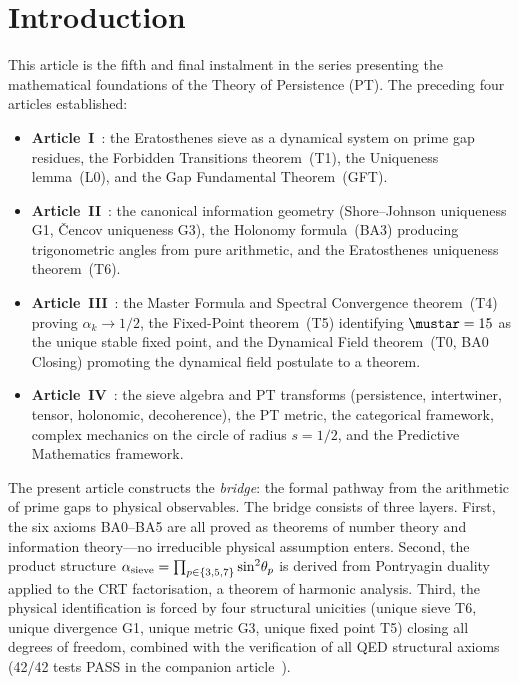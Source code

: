 \documentclass[12pt,a4paper]{article}
\begin{document}
\tableofcontents
\newpage

\section{Introduction}
\label{sec:introduction}

This article is the fifth and final instalment in the series presenting
the mathematical foundations of the Theory of Persistence (PT).  The
preceding four articles established:

\begin{itemize}[nosep]
\item \textbf{Article~I}~\cite{companion_M1}: the Eratosthenes sieve as
  a dynamical system on prime gap residues, the Forbidden Transitions
  theorem~(T1), the Uniqueness lemma~(L0), and the Gap Fundamental
  Theorem~(GFT).
\item \textbf{Article~II}~\cite{companion_M2}: the canonical information
  geometry (Shore--Johnson uniqueness G1, \v{C}encov uniqueness G3),
  the Holonomy formula~(BA3) producing trigonometric angles from pure
  arithmetic, and the Eratosthenes uniqueness theorem~(T6).
\item \textbf{Article~III}~\cite{companion_M3}: the Master Formula and
  Spectral Convergence theorem~(T4) proving $\alpha_k \to 1/2$, the
  Fixed-Point theorem~(T5) identifying $\mustar = 15$ as the unique
  stable fixed point, and the Dynamical Field theorem~(T0, BA0 Closing)
  promoting the dynamical field postulate to a theorem.
\item \textbf{Article~IV}~\cite{companion_M4}: the sieve algebra and PT
  transforms (persistence, intertwiner, tensor, holonomic, decoherence),
  the PT metric, the categorical framework, complex mechanics on the
  circle of radius $s = 1/2$, and the Predictive Mathematics framework.
\end{itemize}

The present article constructs the \emph{bridge}: the formal pathway from
the arithmetic of prime gaps to physical observables.  The bridge consists
of three layers.  First, the six axioms BA0--BA5 are all proved as
theorems of number theory and information theory---no irreducible physical
assumption enters.  Second, the product structure
$\alpha_{\rm sieve} = \prod_{p \in \{3,5,7\}} \sin^2\!\theta_p$ is
derived from Pontryagin duality applied to the CRT factorisation,
a theorem of harmonic analysis.  Third, the physical identification is
forced by four structural unicities (unique sieve T6, unique divergence
G1, unique metric G3, unique fixed point T5) closing all degrees of
freedom, combined with the verification of all QED structural axioms
(42/42 tests PASS in the companion article~\cite{companion_physics}).
\end{document}
